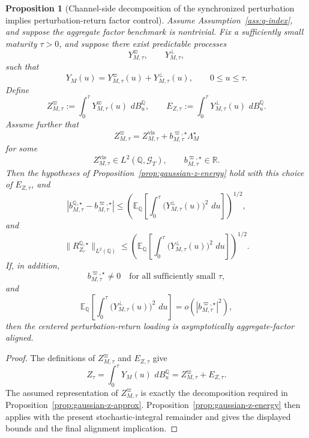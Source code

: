 \documentclass[11pt,a4paper]{amsart}
\theoremstyle{plain}
\newtheorem{proposition}[theorem]{Proposition}
\theoremstyle{definition}
\theoremstyle{remark}
\newcommand{\R}{\mathbb{R}}
\newcommand{\QQ}{\mathbb{Q}}
\newcommand{\EE}{\mathbb{E}}
\newcommand{\cG}{\mathcal{G}}
\newcommand{\dd}{\,d}
\begin{document}
\begin{proposition}[Channel-side decomposition of the synchronized perturbation implies perturbation-return factor control]\label{prop:gaussian-y-to-z}
Assume Assumption~\ref{ass:q-index}, and suppose the aggregate factor benchmark is nontrivial.  Fix
a sufficiently small maturity \(\tau>0\), and suppose there exist predictable processes
\[
        Y_{M,\tau}^{\varpi},
        \qquad
        Y_{M,\tau}^{\perp},
\]
such that
\[
        Y_M(u)=Y_{M,\tau}^{\varpi}(u)+Y_{M,\tau}^{\perp}(u),
        \qquad
        0\le u\le \tau.
\]
Define
\[
        Z_{M,\tau}^{\varpi}
        :=
        \int_0^\tau Y_{M,\tau}^{\varpi}(u)\,\dd B_u^\QQ,
        \qquad
        E_{Z,\tau}
        :=
        \int_0^\tau Y_{M,\tau}^{\perp}(u)\,\dd B_u^\QQ.
\]
Assume further that
\[
        Z_{M,\tau}^{\varpi}
        =
        Z_{M,\tau}^{\mathrm{vis}}
        +
        b_{M,\tau}^{\varpi,\star}\Lambda_M^\star
\]
for some
\[
        Z_{M,\tau}^{\mathrm{vis}}\in L^2(\QQ,\cG_T),
        \qquad
        b_{M,\tau}^{\varpi,\star}\in\R.
\]
Then the hypotheses of Proposition~\ref{prop:gaussian-z-energy} hold with this choice of
\(E_{Z,\tau}\), and
\[
        \left|
                b_{M,\tau}^{\QQ,\star}
                -
                b_{M,\tau}^{\varpi,\star}
        \right|
        \le
        \left(
                \EE_\QQ\!\left[
                        \int_0^\tau \bigl(Y_{M,\tau}^{\perp}(u)\bigr)^2\,\dd u
                \right]
        \right)^{1/2},
\]
and
\[
        \|R_{Z_\tau}^{\QQ,\star}\|_{L^2(\QQ)}
        \le
        \left(
                \EE_\QQ\!\left[
                        \int_0^\tau \bigl(Y_{M,\tau}^{\perp}(u)\bigr)^2\,\dd u
                \right]
        \right)^{1/2}.
\]
If, in addition,
\[
        b_{M,\tau}^{\varpi,\star}\neq0
        \quad\text{for all sufficiently small }\tau,
\]
and
\[
        \EE_\QQ\!\left[
                \int_0^\tau \bigl(Y_{M,\tau}^{\perp}(u)\bigr)^2\,\dd u
        \right]
        =
        o\!\left(|b_{M,\tau}^{\varpi,\star}|^2\right),
\]
then the centered perturbation-return loading is asymptotically aggregate-factor aligned.
\end{proposition}

\begin{proof}
The definitions of \(Z_{M,\tau}^{\varpi}\) and \(E_{Z,\tau}\) give
\[
        Z_\tau
        =
        \int_0^\tau Y_M(u)\,\dd B_u^\QQ
        =
        Z_{M,\tau}^{\varpi}
        +
        E_{Z,\tau}.
\]
The assumed representation of \(Z_{M,\tau}^{\varpi}\) is exactly the decomposition required in
Proposition~\ref{prop:gaussian-z-approx}.  Proposition~\ref{prop:gaussian-z-energy} then applies
with the present stochastic-integral remainder and gives the displayed bounds and the final
alignment implication.
\end{proof}
\end{document}
